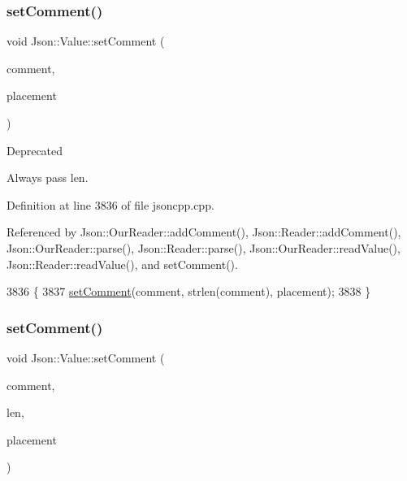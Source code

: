\subsubsection{\texorpdfstring{set\+Comment()}{setComment()}\hspace{0.1cm}{\footnotesize\ttfamily [1/3]}}
{\footnotesize\ttfamily void Json\+::\+Value\+::set\+Comment (\begin{DoxyParamCaption}\item[{const char $\ast$}]{comment,  }\item[{\hyperlink{namespace_json_a4fc417c23905b2ae9e2c47d197a45351}{Comment\+Placement}}]{placement }\end{DoxyParamCaption})}

\begin{DoxyRefDesc}{Deprecated}
\item[\hyperlink{deprecated__deprecated000003}{Deprecated}]Always pass len. \end{DoxyRefDesc}


Definition at line 3836 of file jsoncpp.\+cpp.



Referenced by Json\+::\+Our\+Reader\+::add\+Comment(), Json\+::\+Reader\+::add\+Comment(), Json\+::\+Our\+Reader\+::parse(), Json\+::\+Reader\+::parse(), Json\+::\+Our\+Reader\+::read\+Value(), Json\+::\+Reader\+::read\+Value(), and set\+Comment().


\begin{DoxyCode}
3836                                                                       \{
3837   \hyperlink{class_json_1_1_value_a29f3a30f7e5d3af6f38d57999bf5b480}{setComment}(comment, strlen(comment), placement);
3838 \}
\end{DoxyCode}
\mbox{\label{class_json_1_1_value_a2900152a2887b410a9ddabe278b9d492}} 
\subsubsection{\texorpdfstring{set\+Comment()}{setComment()}\hspace{0.1cm}{\footnotesize\ttfamily [2/3]}}
{\footnotesize\ttfamily void Json\+::\+Value\+::set\+Comment (\begin{DoxyParamCaption}\item[{const char $\ast$}]{comment,  }\item[{size\+\_\+t}]{len,  }\item[{\hyperlink{namespace_json_a4fc417c23905b2ae9e2c47d197a45351}{Comment\+Placement}}]{placement }\end{DoxyParamCaption})}



